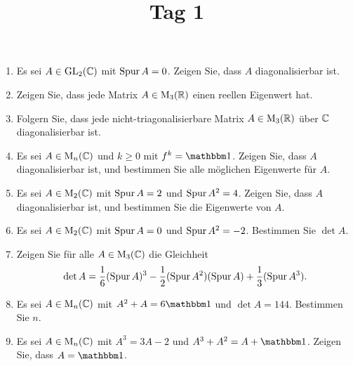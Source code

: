 \documentclass[a4paper, 10pt]{scrartcl}
\title{Tag 1}
\author{}
\date{}
\begin{document}
\begin{question}[subtitle = Eigenwerte und Diagonalisierbarkeit]
  \begin{enumerate}
    \item
      Es sei $A \in \operatorname{GL}_{2}(\mathbb{C})$ mit $\operatorname{Spur} A = 0$.
      Zeigen Sie, dass $A$ diagonalisierbar ist.
    \item
      Zeigen Sie, dass jede Matrix $A \in \operatorname{M}_{3}(\mathbb{R})$ einen reellen Eigenwert hat.
    \item
      Folgern Sie, dass jede nicht-triagonalisierbare Matrix $A \in \operatorname{M}_{3}(\mathbb{R})$ über $\mathbb{C}$ diagonalisierbar ist.
    \item
      Es sei $A \in \operatorname{M}_{n}(\mathbb{C})$ und $k \geq 0$ mit $f^k = \Id$.
      Zeigen Sie, dass $A$ diagonalisierbar ist, und bestimmen Sie alle möglichen Eigenwerte für $A$.
    \item
      Es sei $A \in \operatorname{M}_{2}(\mathbb{C})$ mit $\operatorname{Spur} A = 2$ und $\operatorname{Spur} A^2 = 4$.
      Zeigen Sie, dass $A$ diagonalisierbar ist, und bestimmen Sie die Eigenwerte von $A$.
    \item
      Es sei $A \in \operatorname{M}_{2}(\mathbb{C})$ mit $\operatorname{Spur} A = 0$ und $\operatorname{Spur} A^2 = -2$.
      Bestimmen Sie $\det A$.
    \item
      Zeigen Sie für alle $A \in \operatorname{M}_{3}(\mathbb{C})$ die Gleichheit
      \[
          \det A
        =   \frac{1}{6} (\operatorname{Spur} A)^3
          - \frac{1}{2} (\operatorname{Spur} A^2)(\operatorname{Spur} A)
          + \frac{1}{3} (\operatorname{Spur} A^3).
      \]
    \item
      Es sei $A \in \operatorname{M}_{n}(\mathbb{C})$ mit $A^2 + A = 6 \Id$ und $\det A = 144$.
      Bestimmen Sie $n$.
    \item
      Es sei $A \in \operatorname{M}_{n}(\mathbb{C})$ mit $A^3 = 3A - 2$ und $A^3 + A^2 = A + \Id$.
      Zeigen Sie, dass $A = \Id$.
  \end{enumerate}
\end{question}
\end{document}
